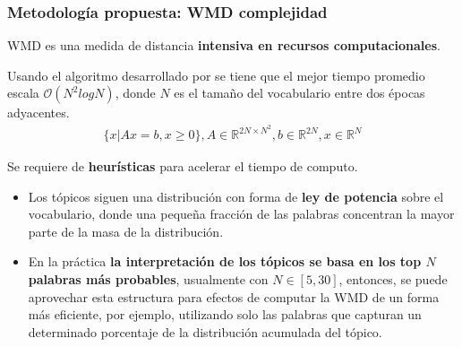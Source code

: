 \documentclass[
	spanish, %
	aspectratio=43, %
	hyperref={pdfencoding=auto,psdextra},
	xcolor={dvipsnames,table,usenames},
]{beamer}
\begin{document}
\begin{frame}[t]
\frametitle{Metodología propuesta: WMD complejidad}

WMD es una medida de distancia \textbf{intensiva en recursos computacionales}.\newline

Usando el algoritmo desarrollado por \cite{pele2009fast} se tiene que el mejor tiempo promedio escala $\mathcal{O}(N^{2}log N)$, donde $N$ es el tamaño del vocabulario entre dos épocas adyacentes.
  \begin{align*}
\{x| Ax=b, x\geq 0\}, A\in \mathbb{R}^{2N\times N^{2}}, b\in \mathbb{R}^{2N}, x\in \mathbb{R}^{N}
  \end{align*}

Se requiere de \textbf{heurísticas} para acelerar el tiempo de computo.
\begin{itemize}
  \item Los tópicos siguen una distribución con forma de \textbf{ley de potencia} sobre el vocabulario, donde una pequeña fracción de las palabras concentran la mayor parte de la masa de la distribución. 
  \item En la práctica \textbf{la interpretación de los tópicos se basa en los top $N$ palabras más probables}, usualmente con $N \in [5, 30]$, entonces, se puede aprovechar esta estructura para efectos de computar la WMD de un forma más eficiente, por ejemplo, utilizando solo las palabras que capturan un determinado porcentaje de la distribución acumulada del tópico.\\
\end{itemize}
\end{frame}
\end{document}
